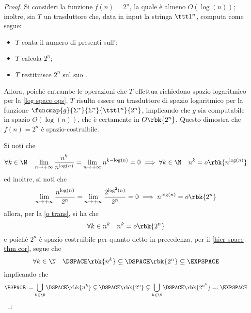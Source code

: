\documentclass[a4paper, 12pt]{report}
\begin{document}
    \begin{proof} 
        Si consideri la funzione $f(n) = 2^n$, la quale è almeno $O(\log(n))$; inoltre, sia $T$ un trasduttore che, data in input la stringa $\ttt 1^n$, computa come segue:

        \begin{itemize}
            \item $T$ conta il numero di  presenti sull';
            \item $T$ calcola $2^n$;
            \item $T$ restituisce $2^n$ sul suo .
        \end{itemize}

        Allora, poiché entrambe le operazioni che $T$ effettua richiedono spazio logaritmico per la \cref{log space ops}, $T$ risulta essere un trasduttore di spazio logaritmico per la funzione $\funcmap{g}{\Sigma^*}{\Sigma^*}{\ttt 1^n}{2^n}$, implicando che $g$ sia computabile in spazio $O(\log(n))$, che è certamente in $O \rbk{2^n}$. Questo dimostra che $f(n) = 2^n$ è spazio-costruibile.

        Si noti che $$\forall k \in \N \quad \displaystyle \lim_{n \to + \infty}{\dfrac{n^k}{n^{\log(n)}}} = \lim_{n \to + \infty}{n^{k - \log(n)}}= 0 \implies \forall k \in \N \quad n^k = o \rbk{n ^{\log(n)}}$$ ed inoltre, si noti che $$\displaystyle \lim_{n \to + \infty}{\dfrac{n^{\log(n)}}{2^n}} = \lim_{n \to + \infty}{\dfrac{2^{\log^2(n)}}{2^n}} = 0 \implies n^{\log(n)} = o \rbk{2^n}$$ allora, per la \cref{o trans}, si ha che $$\forall k \in n^k \quad n^k =  o \rbk{2^n}$$ e poiché $2^n$ è spazio-costruibile per quanto detto in precedenza, per il \cref{hier space thm cor}, segue che $$\forall k \in \N \quad \DSPACE \rbk{n^k} \subsetneq \DSPACE \rbk{2^n} \subsetneq \EXPSPACE$$ implicando che $$\PSPACE := \bigcup_{k \in \N}{\DSPACE \rbk{n^k}} \subsetneq \DSPACE \rbk{2^n} \subsetneq \bigcup_{h \in \N}{\DSPACE \rbk{2^{n^h}}} =: \EXPSPACE$$
    \end{proof}
\end{document}
